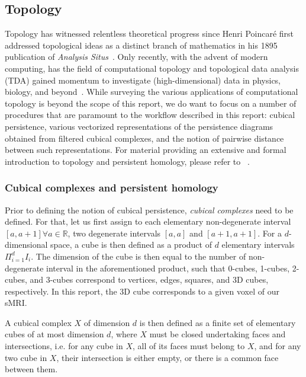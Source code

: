 \documentclass{article}
\begin{document}
\subsection{Topology}

Topology has witnessed relentless theoretical progress since Henri Poincaré first addressed
topological ideas as a distinct branch of mathematics in his 1895 publication of \textit{Analysis
  Situs}~\citep{poincare1895analysis, james1999history}. Only recently, with the advent of
modern computing, has the field of computational topology and topological data analysis (TDA) gained
momentum to investigate (high-dimensional) data in physics, biology, and
beyond~\citep{dey1999computational, ghrist2008barcodes, amezquita2020shape}. While surveying the
various applications of computational topology is beyond the scope of this report, we do want to
focus on a number of procedures that are paramount to the workflow described in this report: cubical
persistence, various vectorized representations of the persistence diagrams obtained from filtered
cubical complexes, and the notion of pairwise distance between such representations. For material
providing an extensive and formal introduction to topology and persistent homology, please refer to
~\citep{freedman2009algebraic, edelsbrunner2010computational, ghrist2008barcodes}.


\subsubsection{Cubical complexes and persistent homology}

Prior to defining the notion of cubical persistence, \emph{cubical complexes} need to be defined.
For that, let us first assign to each elementary non-degenerate interval $[a,a+1]\forall
a\in\mathbb{R}$, two degenerate intervals $[a,a]$ and $[a+1,a+1]$. For a $d$-dimensional space, a
cube is then defined as a product of $d$ elementary intervals $\Pi_{i=1}^{d}I_i$. The dimension of
the cube is then equal to the number of non-degenerate interval in the aforementioned product, such
that 0-cubes, 1-cubes, 2-cubes, and 3-cubes correspond to vertices, edges, squares, and 3D cubes,
respectively. In this report, the 3D cube corresponds to a given voxel of our sMRI.

A cubical complex $X$ of dimension $d$ is then defined as a finite set of elementary cubes of at
most dimension $d$, where $X$ must be closed undertaking faces and intersections, i.e. for any cube
in $X$, all of its faces must belong to $X$, and for any two cube in $X$, their intersection is
either empty, or there is a common face between them.
\end{document}
